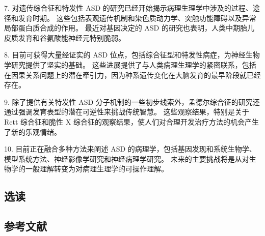 7. 对遗传综合征和特发性 ASD 的研究已经开始揭示病理生理学中涉及的过程、途径和发育时期。 这些包括表观遗传机制和染色质动力学、突触功能障碍以及异常局部蛋白质合成的作用。 最近对基因决定的 ASD 的研究也表明，人类中期胎儿皮质发育和谷氨酸能神经元特别脆弱。 

8. 目前可获得大量经证实的 ASD 位点，包括综合征型和特发性病症，为神经生物学研究提供了坚实的基础。 这些进展提供了与人类病理生理学的紧密联系，包括在因果关系问题上的潜在牵引力，因为种系遗传变化在大脑发育的最早阶段就已经存在。 

9. 除了提供有关特发性 ASD 分子机制的一些初步线索外，孟德尔综合征的研究还通过强调发育表型的潜在可逆性来挑战传统智慧。 这些观察结果，特别是关于 Rett 综合征和脆性 X 综合征的观察结果，使人们对合理开发治疗方法的机会产生了新的乐观情绪。 

10. 目前正在融合多种方法来阐述 ASD 的病理学，包括基因发现和系统生物学、模型系统方法、神经影像学研究和神经病理学研究。 未来的主要挑战将是从对生物学的一般理解转变为对病理生理学的可操作理解。

\subsection{选读}
\subsection{参考文献}